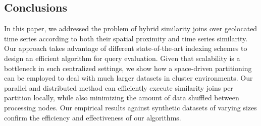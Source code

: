 \subsection{Conclusions}
\label{sec:conclusions}

In this paper, we addressed the problem of hybrid similarity joins over geolocated time series according to both their spatial proximity and time series similarity. Our approach takes advantage of different state-of-the-art indexing schemes to design an efficient algorithm for query evaluation. Given that scalability is a bottleneck in such centralized settings, we show how a space-driven partitioning can be employed to deal with much larger datasets in cluster environments. Our parallel and distributed method can efficiently execute similarity joins per partition locally, while also minimizing the amount of data shuffled between processing nodes. Our empirical results against synthetic datasets of varying sizes confirm the efficiency and effectiveness of our algorithms.